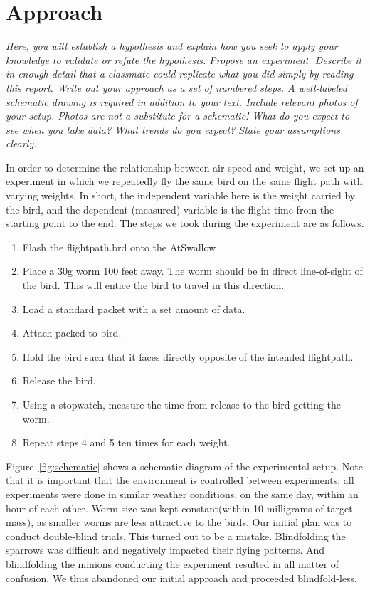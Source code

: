 \section{Approach}
\label{sec:approach}

\emph{Here, you will establish a hypothesis and explain how you seek to apply your knowledge to validate or refute the hypothesis.  Propose an experiment.  Describe it in enough detail that a classmate could replicate what you did simply by reading this report. Write out your approach as a set of numbered steps. A well-labeled schematic drawing is required in addition to your text. Include relevant photos of your setup. Photos are not a substitute for a schematic! What do you expect to see when you take data?  What trends do you expect? State your assumptions clearly.}

In order to determine the relationship between air speed and weight, we set up an experiment in which we repeatedly fly the same bird on the same flight path with varying weights. In short, the independent variable here is the weight carried by the bird, and the dependent (measured) variable is the flight time from the starting point to the end. The steps we took during the experiment are as follows.

\begin{enumerate}
\item Flash the flightpath.brd onto the AtSwallow
\item Place a 30g worm 100 feet away. The worm should be in direct line-of-sight of the bird. This will entice the bird to travel in this direction.
\item Load a standard packet with a set amount of data.
\item Attach packed to bird.
\item Hold the bird such that it faces directly opposite of the intended flightpath.
\item Release the bird.
\item Using a stopwatch, measure the time from release to the bird getting the worm.
\item Repeat steps 4 and 5 ten times for each weight.
\end{enumerate}

Figure~\ref{fig:schematic} shows a schematic diagram of the experimental setup. Note that it is important that the environment is controlled between experiments; all experiments were done in similar weather conditions, on the same day, within an hour of each other. Worm size was kept constant(within 10 milligrams of target mass), as smaller worms are less attractive to the birds.  Our initial plan was to conduct double-blind trials.  This turned out to be a mistake.  Blindfolding the sparrows was difficult and negatively impacted their flying patterns.  And blindfolding the minions conducting the experiment resulted in all matter of confusion.  We thus abandoned our initial approach and proceeded blindfold-less.

